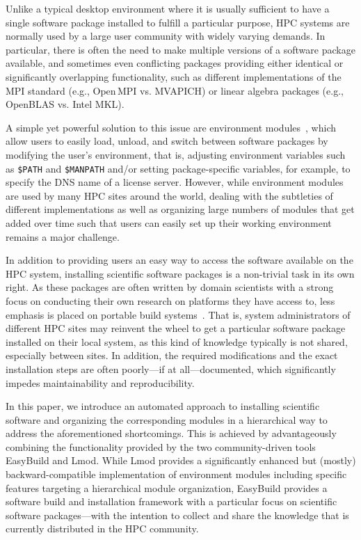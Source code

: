 Unlike a typical desktop environment where it is usually sufficient to have a
single software package installed to fulfill a particular purpose, HPC
systems are normally used by a large user community with widely varying
demands. In particular, there is often the need to make multiple versions of
a software package available, and sometimes even conflicting packages
providing either identical or significantly overlapping functionality, such
as different implementations of the MPI standard (e.g., Open\,MPI vs.
MVAPICH) or linear algebra packages (e.g., OpenBLAS vs. Intel MKL).

A simple yet powerful solution to this issue are environment
modules~\cite{furlani91,furlani96,eadline,cmod,laytonEM1}, which allow
users to easily load, unload, and switch between software packages by
modifying the user's environment, that is, adjusting environment
variables such as \texttt{\$PATH} and \texttt{\$MANPATH} and/or setting
package-specific variables, for example, to specify the DNS name of a
license server. However, while environment modules are used by many
HPC sites around the world, dealing with the subtleties of different
implementations as well as organizing large numbers of modules that
get added over time such that users can easily set up their working environment
remains a major challenge.

In addition to providing users an easy way to access the software available
on the HPC system, installing scientific software packages is a non-trivial
task in its own right. As these packages are often written by domain
scientists with a strong focus on conducting their own research on platforms
they have access to, less emphasis is placed on portable build
systems~\cite{Dubois03}. That
is, system administrators of different HPC sites may reinvent the wheel to
get a particular software package installed on their local system, as this
kind of knowledge typically is not shared, especially between sites. In
addition, the required modifications and the exact installation steps are
often poorly---if at all---documented, which significantly impedes
maintainability and reproducibility.

In this paper, we introduce an automated approach to installing scientific
software and organizing the corresponding modules in a hierarchical way to
address the aforementioned shortcomings. This is achieved by advantageously
combining the functionality provided by the two community-driven tools
EasyBuild and Lmod. While Lmod provides a significantly enhanced but (mostly)
backward-compatible implementation of environment modules including specific
features targeting a hierarchical module organization, EasyBuild provides a
software build and installation framework with a particular focus on
scientific software packages---with the intention to collect and share the
knowledge that is currently distributed in the HPC community.

